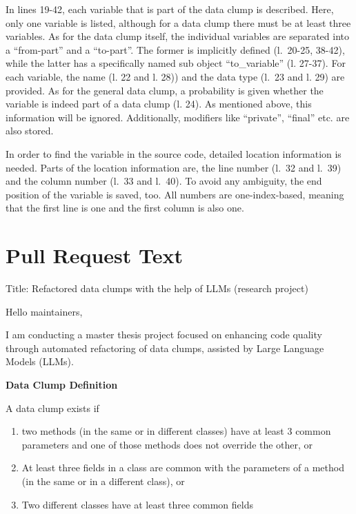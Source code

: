 \begin{appendices}
In lines 19-42, each variable that is part of the data clump is described. Here, only one variable is listed, although for a data clump there must be at least three variables. As for the data clump itself, the individual variables are separated into a \enquote{from-part} and a \enquote{to-part}. The former is implicitly defined (l.~20-25, 38-42), while the latter has a specifically named sub object \enquote{to\_variable} (l. 27-37). For each variable, the name (l. 22 and l. 28)) and the data type (l.~23 and l. 29) are provided. As for the general data clump, a probability is given whether the variable is indeed part of a data clump (l. 24). As mentioned above, this information will be ignored.  Additionally, modifiers like \enquote{private}, \enquote{final} etc. are also stored. 

In order to find the variable in the source code, detailed location information is needed. Parts of the location information are, the line number (l.~32 and l.~39) and the column number (l.~33 and l.~40). To avoid any ambiguity, the end position of the variable is saved, too. All numbers are one-index-based, meaning that the first line is one and the first column is also one. 


\chapter{Pull Request Text}


Title:  Refactored data clumps with the help of LLMs (research project)


Hello maintainers,

I am conducting a master thesis project focused on enhancing code quality through automated refactoring of data clumps, assisted by Large Language Models (LLMs).\newline


\textbf{Data Clump Definition}
\newline

A data clump exists if
\begin{enumerate}
    \item  two methods (in the same or in different classes) have at least 3 common parameters and one of those methods does not override the other,  or
    \item  At least three fields in a class are common with the parameters of a method (in the same or in a different class), or
    \item  Two different classes have at least three common fields
\end{enumerate}


\end{appendices}
